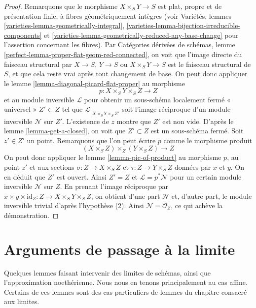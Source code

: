 \begin{proof}
Remarquons que le morphisme $X \times_S Y \to S$ est plat, propre
et de présentation finie, à fibres géométriquement intègres
(voir Variétés, lemmes \ref{varieties-lemma-geometrically-integral},
\ref{varieties-lemma-bijection-irreducible-components}
et \ref{varieties-lemma-geometrically-reduced-any-base-change} pour
l'assertion concernant les fibres). Par Catégories dérivées de schémas, lemme
\ref{perfect-lemma-proper-flat-geom-red-connected},
on voit que l'image directe du faisceau structural par $X \to S$, $Y \to S$ ou
$X \times_S Y \to S$ est le faisceau structural de $S$, et que cela reste vrai
après tout changement de base. On peut donc appliquer
le lemme \ref{lemma-diagonal-picard-flat-proper} au morphisme
$$
p : X \times_S Y \times_S Z \longrightarrow Z
$$
et au module inversible $\mathcal{L}$ pour obtenir un sous-schéma localement fermé
« universel » $Z' \subset Z$ tel que $\mathcal{L}|_{X \times_S Y \times_S Z'}$
soit l'image réciproque d'un module inversible $\mathcal{N}$ sur $Z'$.
L'existence de $z$ montre que $Z'$ est non vide. D'après le
lemme \ref{lemma-get-a-closed},
on voit que $Z' \subset Z$ est un sous-schéma fermé.
Soit $z' \in Z'$ un point.
Remarquons que l'on peut écrire $p$ comme le morphisme produit
$$
(X \times_S Z) \times_Z (Y \times_S Z) \longrightarrow Z
$$
On peut donc appliquer le lemme \ref{lemma-pic-of-product}
au morphisme $p$, au point $z'$ et aux sections
$\sigma : Z \to X \times_S Z$ et $\tau : Z \to Y \times_S Z$
données par $x$ et $y$. On en déduit que $Z'$ est ouvert.
Ainsi $Z' = Z$ et $\mathcal{L} = p^*\mathcal{N}$
pour un certain module inversible $\mathcal{N}$ sur $Z$.
En prenant l'image réciproque par
$x \times y \times \text{id}_Z : Z  \to X \times_S Y \times_S Z$,
on obtient d'une part $\mathcal{N}$ et, d'autre part,
le module inversible trivial d'après l'hypothèse (2).
Ainsi $\mathcal{N} = \mathcal{O}_Z$, ce qui achève la démonstration.
\end{proof}









\section{Arguments de passage à la limite}
\label{section-limits}

\noindent
Quelques lemmes faisant intervenir des limites de schémas, ainsi que l'approximation
noethérienne. Nous nous en tenons principalement au cas affine. Certains de ces lemmes sont des
cas particuliers de lemmes du chapitre consacré aux limites.

